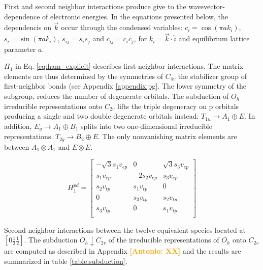 \documentclass[twocolumn,showpacs,preprintnumbers,superscriptaddress,prb,floatfix,aps,10pt]{revtex4-1}
\newcommand{\abmei}[1]{\textcolor{orange}{ \bf [Antonio: #1] }}
\begin{document}
First and second neighbor interactions produce give to the wavevector-dependence of electronic energies. In the equations presented below, the dependencis on $\vec{k}$ occur through the condensed variables: $c_i = \cos(\pi a k_i)$, $s_i = \sin(\pi a k_i)$, $s_{ij} = s_i s_j$ and $c_{ij} = c_i c_j$, for $k_i = \vec{k}\cdot\hat{i}$ and equilibrium lattice parameter $a$.

$H_1$ in Eq. \ref{eq:ham_explicit} describes first-neighbor interactions. 
The matrix elements are thus determined by the symmetries of $C_{4v}$ the stabilizer group of first-neighbor bonds (see Appendix \ref{appendix:pg}. The lower symmetry of the subgroup, reduces the number of degenerate orbitals. The subduction of $O_h$ irreducible representations onto $C_{2v}$ lifts the triple degeneracy on p orbitals producing a single and two double degenerate orbitals instead: $T_{1u} \rightarrow A_1 \oplus E$. In addition, $E_g \rightarrow A_1 \oplus B_1$ splits into two one-dimensional irreducible representations. $T_{2g} \rightarrow B_2 \oplus E$. The only nonvanishing matrix elements are between $A_1 \otimes A_1$ and $E \otimes E$.

\begin{equation}
H_1^{pd} = 
\begin{bmatrix}
-\sqrt{3} s_1 v_{ep} & 0            & \sqrt{3} s_3 v_{ep}  \\ %
 s_1 v_{ep}          &-2 s_2 v_{ep} &  s_3 v_{ep}          \\ %
 s_2 v_{tp}          &  s_1 v_{tp}  & 0                    \\
0                    &  s_3 v_{tp}  &  s_2 v_{tp}          \\
 s_3 v_{tp}          & 0            &  s_1 v_{tp}          \\
\end{bmatrix}
\end{equation}

Second-neighbor interactions between the twelve equivalent species located at $[0\frac{1}{2}\frac{1}{2}]$. The subduction $O_h\downarrow C_{2v}$ of the irreducible representations of $O_h$ onto $C_{2v}$ are computed as described in Appendix \abmei{XX} and the results are summarized in table \ref{table:subduction}. 
\end{document}
